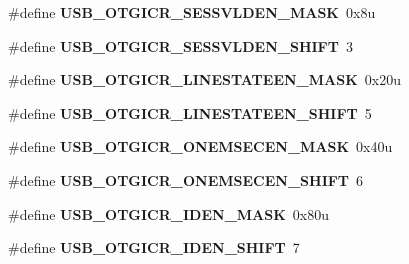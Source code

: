 \begin{DoxyCompactItemize}
\item 
\hypertarget{group___u_s_b___register___masks_ga35e32e6ed718719eb90a5aa7b8af10f3}{}\#define {\bfseries U\+S\+B\+\_\+\+O\+T\+G\+I\+C\+R\+\_\+\+S\+E\+S\+S\+V\+L\+D\+E\+N\+\_\+\+M\+A\+S\+K}~0x8u\label{group___u_s_b___register___masks_ga35e32e6ed718719eb90a5aa7b8af10f3}

\item 
\hypertarget{group___u_s_b___register___masks_ga6f1a0dd83404b56be4be006b113f68d8}{}\#define {\bfseries U\+S\+B\+\_\+\+O\+T\+G\+I\+C\+R\+\_\+\+S\+E\+S\+S\+V\+L\+D\+E\+N\+\_\+\+S\+H\+I\+F\+T}~3\label{group___u_s_b___register___masks_ga6f1a0dd83404b56be4be006b113f68d8}

\item 
\hypertarget{group___u_s_b___register___masks_gac9d12e9bdf0d60b52ea0b99c668630af}{}\#define {\bfseries U\+S\+B\+\_\+\+O\+T\+G\+I\+C\+R\+\_\+\+L\+I\+N\+E\+S\+T\+A\+T\+E\+E\+N\+\_\+\+M\+A\+S\+K}~0x20u\label{group___u_s_b___register___masks_gac9d12e9bdf0d60b52ea0b99c668630af}

\item 
\hypertarget{group___u_s_b___register___masks_ga1824eae0010a884c2b3bd425cfa2b389}{}\#define {\bfseries U\+S\+B\+\_\+\+O\+T\+G\+I\+C\+R\+\_\+\+L\+I\+N\+E\+S\+T\+A\+T\+E\+E\+N\+\_\+\+S\+H\+I\+F\+T}~5\label{group___u_s_b___register___masks_ga1824eae0010a884c2b3bd425cfa2b389}

\item 
\hypertarget{group___u_s_b___register___masks_gac68531fd32d53520e1d1ccdd4cfae9ec}{}\#define {\bfseries U\+S\+B\+\_\+\+O\+T\+G\+I\+C\+R\+\_\+\+O\+N\+E\+M\+S\+E\+C\+E\+N\+\_\+\+M\+A\+S\+K}~0x40u\label{group___u_s_b___register___masks_gac68531fd32d53520e1d1ccdd4cfae9ec}

\item 
\hypertarget{group___u_s_b___register___masks_ga29ccacd7b79d6d2df3b8743ccd1c467f}{}\#define {\bfseries U\+S\+B\+\_\+\+O\+T\+G\+I\+C\+R\+\_\+\+O\+N\+E\+M\+S\+E\+C\+E\+N\+\_\+\+S\+H\+I\+F\+T}~6\label{group___u_s_b___register___masks_ga29ccacd7b79d6d2df3b8743ccd1c467f}

\item 
\hypertarget{group___u_s_b___register___masks_gaa13997b88383cb1aec6f042ecdb94399}{}\#define {\bfseries U\+S\+B\+\_\+\+O\+T\+G\+I\+C\+R\+\_\+\+I\+D\+E\+N\+\_\+\+M\+A\+S\+K}~0x80u\label{group___u_s_b___register___masks_gaa13997b88383cb1aec6f042ecdb94399}

\item 
\hypertarget{group___u_s_b___register___masks_ga36d7ef200033a393e023ab06808f7129}{}\#define {\bfseries U\+S\+B\+\_\+\+O\+T\+G\+I\+C\+R\+\_\+\+I\+D\+E\+N\+\_\+\+S\+H\+I\+F\+T}~7\label{group___u_s_b___register___masks_ga36d7ef200033a393e023ab06808f7129}


\end{DoxyCompactItemize}
